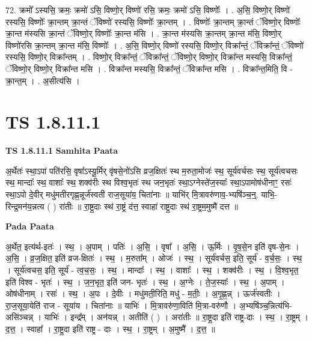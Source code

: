 \documentclass[17pt]{extarticle}
\begin{document}
72. क्रमो᳚ ऽस्यसि॒ क्रमः॒ क्रमो॑ ऽसि॒ विष्णो॒र् विष्णो॑ रसि॒ क्रमः॒ क्रमो॑ ऽसि॒ विष्णोः᳚ । . अ॒सि॒ विष्णो॒र् विष्णो॑ रस्यसि॒ विष्णोः᳚ क्रा॒न्तम् क्रा॒न्तं ॅविष्णो॑ रस्यसि॒ विष्णोः᳚ क्रा॒न्तम् । . विष्णोः᳚ क्रा॒न्तम् क्रा॒न्तं ॅविष्णो॒र् विष्णोः᳚ क्रा॒न्त म॑स्यसि क्रा॒न्तं ॅविष्णो॒र् विष्णोः᳚ क्रा॒न्त म॑सि । . क्रा॒न्त म॑स्यसि क्रा॒न्तम् क्रा॒न्त म॑सि॒ विष्णो॒र् विष्णो॑रसि क्रा॒न्तम् क्रा॒न्त म॑सि॒ विष्णोः᳚ । . अ॒सि॒ विष्णो॒र् विष्णो॑ रस्यसि॒ विष्णो॒र् विक्रा᳚न्तं॒ ॅविक्रा᳚न्तं॒ ॅविष्णो॑ रस्यसि॒ विष्णो॒र् विक्रा᳚न्तम् । . विष्णो॒र् विक्रा᳚न्तं॒ ॅविक्रा᳚न्तं॒ ॅविष्णो॒र् विष्णो॒र् विक्रा᳚न्त मस्यसि॒ विक्रा᳚न्तं॒ ॅविष्णो॒र् विष्णो॒र् विक्रा᳚न्त मसि । . विक्रा᳚न्त मस्यसि॒ विक्रा᳚न्तं॒ ॅविक्रा᳚न्त मसि । . विक्रा᳚न्त॒मिति॒ वि - क्रा॒न्त॒म् । . अ॒सीत्य॑सि । \newline
\pagebreak
{}

\section{ TS 1.8.11.1 }

\textbf{TS 1.8.11.1 } \newline
\textbf{Samhita Paata} \newline

अ॒र्थेतः॑ स्था॒ऽपां पति॑रसि॒ वृषा᳚ऽस्यू॒र्मिर् वृ॑षसे॒नो॑ऽसि व्रज॒क्षितः॑ स्थ म॒रुता॒मोजः॑ स्थ॒ सूर्य॑वर्चसः स्थ॒ सूर्य॑त्वचसः स्थ॒ मान्दाः᳚ स्थ॒ वाशाः᳚ स्थ॒ शक्व॑रीः स्थ विश्व॒भृतः॑ स्थ जन॒भृतः॑ स्था॒ऽग्नेस्ते॑ज॒स्याः᳚ स्था॒ऽपामोष॑धीनाꣳ॒॒ रसः॑ स्था॒ऽपो दे॒वीर् मधु॑मतीरगृह्ण॒न्नूर्ज॑स्वती राज॒सूया॑य॒ चिता॑नाः ॥ याभि॑र् मि॒त्रावरु॑णाव॒-भ्यषि॑ञ्च॒न्॒. याभि॒-रिन्द्र॒मन॑य॒न्नत्य ( ) रा॑तीः ॥ रा॒ष्ट्र॒दाः स्थ॑ रा॒ष्ट्रं द॑त्त॒ स्वाहा॑ राष्ट्र॒दाः स्थ॑ रा॒ष्ट्रम॒मुष्मै॑ दत्त ॥ \newline

\textbf{Pada Paata} \newline

अ॒र्थेत॒ इत्य॑र्थ-इतः॑ । स्थ॒ । अ॒पाम् । पतिः॑ । अ॒सि॒ । वृषा᳚ । अ॒सि॒ । ऊ॒र्मिः । वृ॒ष॒से॒न इति॑ वृष-से॒नः । अ॒सि॒ । व्र॒ज॒क्षित॒ इति॑ व्रज-क्षितः॑ । स्थ॒ । म॒रुता᳚म् । ओजः॑ । स्थ॒ । सूर्य॑वर्चस॒ इति॒ सूर्य॑ - व॒र्च॒सः॒ । स्थ॒ । सूर्य॑त्वचस॒ इति॒ सूर्य॑ - त्व॒च॒सः॒ । स्थ॒ । मान्दाः᳚ । स्थ॒ । वाशाः᳚ । स्थ॒ । शक्व॑रीः । स्थ॒ । वि॒श्व॒भृत॒ इति॑ विश्व - भृतः॑ । स्थ॒ । ज॒न॒भृत॒ इति॑ जन- भृतः॑ । स्थ॒ । अ॒ग्नेः । ते॒ज॒स्याः᳚ । स्थ॒ । अ॒पाम् । ओष॑धीनाम् । रसः॑ । स्थ॒ । अ॒पः । दे॒वीः । मधु॑मती॒रिति॒ मधु॑ - म॒तीः॒ । अ॒गृ॒ह्ण॒न्न् । ऊर्ज॑स्वतीः । रा॒ज॒सूया॒येति॑ राज - सूया॑य । चिता॑नाः ॥ याभिः॑ । मि॒त्रावरु॑णा॒विति॑ मि॒त्रा-वरु॑णौ । अ॒भ्यषि॑ञ्च॒न्नित्य॑भि-असि॑ञ्चन्न् । याभिः॑ । इन्द्र᳚म् । अन॑यन्न् । अतीति॑ ( ) । अरा॑तीः ॥ रा॒ष्ट्र॒दा इति॑ राष्ट्र-दाः । स्थ॒ । रा॒ष्ट्रम् । द॒त्त॒ । स्वाहा᳚ । रा॒ष्ट्र॒दा इति॑ राष्ट्र - दाः । स्थ॒ । रा॒ष्ट्रम् । अ॒मुष्मै᳚ । द॒त्त॒ ॥  \newline
\end{document}
